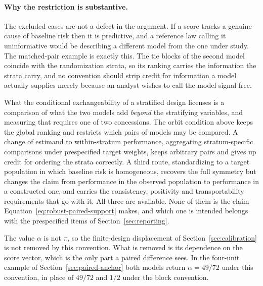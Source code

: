 \documentclass[11pt]{article}
\theoremstyle{remark}
\begin{document}
\paragraph{Why the restriction is substantive.}
The excluded cases are not a defect in the argument. If a score tracks a genuine cause of baseline risk then it is predictive, and a reference law calling it uninformative would be describing a different model from the one under study. The matched-pair example is exactly this. The tie blocks of the second model coincide with the randomization strata, so its ranking carries the information the strata carry, and no convention should strip credit for information a model actually supplies merely because an analyst wishes to call the model signal-free.

What the conditional exchangeability of a stratified design licenses is a comparison of what the two models add \emph{beyond} the stratifying variables, and measuring that requires one of two concessions. The orbit condition above keeps the global ranking and restricts which pairs of models may be compared. A change of estimand to within-stratum performance, aggregating stratum-specific comparisons under prespecified target weights, keeps arbitrary pairs and gives up credit for ordering the strata correctly. A third route, standardizing to a target population in which baseline risk is homogeneous, recovers the full symmetry but changes the claim from performance in the observed population to performance in a constructed one, and carries the consistency, positivity and transportability requirements that go with it. All three are available. None of them is the claim Equation~\eqref{eq:robust-paired-support} makes, and which one is intended belongs with the prespecified items of Section~\ref{sec:reporting}.


The value $\alpha$ is not $\pi$, so the finite-design displacement of Section~\ref{sec:calibration} is not removed by this convention. What is removed is its dependence on the score vector, which is the only part a paired difference sees. In the four-unit example of Section~\ref{sec:paired-anchor} both models return $\alpha=49/72$ under this convention, in place of $49/72$ and $1/2$ under the block convention.
\end{document}

